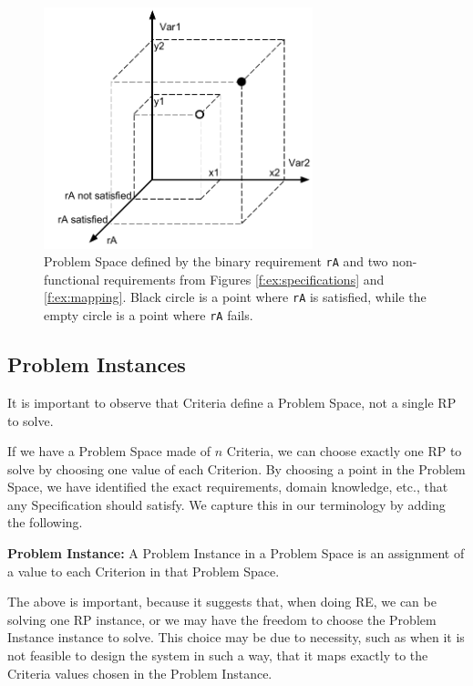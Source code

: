 \documentclass[graybox]{svmult}
\newcommand{\xb}[1]{\textbf{#1}}
\newcommand{\xt}[1]{\texttt{#1}}
\newcommand{\req}[1]{\xt{#1}}
\newcommand{\RE}{RE}
\newcommand{\RP}{RP}
\newcommand{\ProblemSpace}{Problem Space}
\newcommand{\Specification}{Specification}
\newcommand{\Criterion}{Criterion}
\newcommand{\Criteria}{Criteria}
\newcommand{\ProblemInstance}{Problem Instance}
\begin{document}
\begin{figure}[t]
	\centering
	\includegraphics[height=70mm]{Figures/f-ex-problem-space-ra-var1-var2}
\caption{\ProblemSpace{} defined by the binary requirement \req{rA} and two non-functional requirements from Figures \ref{f:ex:specifications} and \ref{f:ex:mapping}. Black circle is a point where \req{rA} is satisfied, while the empty circle is a point where \req{rA} fails.}
\label{f:ex:problem-space-ra-var1-var2}
\end{figure}


%
\subsection{\ProblemInstance s}\label{s:spaces:problem-instances}
It is important to observe that \Criteria{} define a \ProblemSpace, not a single \RP{} to solve. 

If we have a \ProblemSpace{} made of $n$ \Criteria, we can choose exactly one \RP{} to solve by choosing one value of each \Criterion. By choosing a point in the \ProblemSpace, we have identified the exact requirements, domain knowledge, etc., that any \Specification{} should satisfy. We capture this in our terminology by adding the following.

\begin{definition}\label{d:problem-instance}
\xb{\ProblemInstance:} A \ProblemInstance{} in a \ProblemSpace{} is an assignment of a value to each \Criterion{} in that \ProblemSpace.
\end{definition}

The above is important, because it suggests that, when doing \RE, we can be solving one \RP{} instance, or we may have the freedom to choose the \ProblemInstance{} instance to solve. This choice may be due to necessity, such as when it is not feasible to design the system in such a way, that it maps exactly to the \Criteria{} values chosen in the \ProblemInstance.
\end{document}
